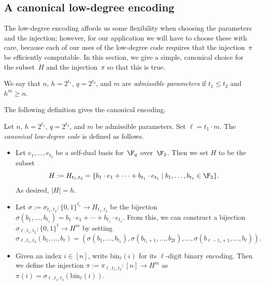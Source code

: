 \documentclass[11pt]{article}
\begin{document}
\subsection{A canonical low-degree encoding}

The low-degree encoding affords us some flexibility when choosing the parameters and the injection;
however, for our application we will have to choose these with care,
because each of our uses of the low-degree code requires that the injection~$\pi$ be efficiently computable.
In this section, we give a simple, canonical choice for the subset~$H$ and the injection~$\pi$ so that this is true.

\begin{definition}\label{def:admissible-prelims}
We say that
$n$,
$h= 2^{t_1}$,
$q = 2^{t_2}$,
and $m$
are \emph{admissible parameters} if $t_1 \leq t_2$ and $h^m\geq n$.
\end{definition}

The following definition gives the canonical encoding.

\begin{definition}\label{def:canonical-low-degree}
Let $n$, $h = 2^{t_1}$, $q= 2^{t_2}$, and $m$ be admissible parameters.
Set $\ell = t_1 \cdot m$.
The \emph{canonical low-degree code} is defined as follows.
\begin{itemize}
\item[(i)] Let $e_1, \ldots, e_{t_2}$ be a self-dual basis for~$\F_q$ over~$\F_2$. Then we set $H$ to be the subset
	\begin{equation*}
		H:= H_{t_1, t_2} = \{b_1 \cdot e_1 + \cdots + b_{t_1} \cdot e_{t_1} \mid b_1, \ldots, b_{t_1} \in \F_2\}.
	\end{equation*}
	As desired, $|H| = h$.
\item[(ii)] Let $\sigma:= \sigma_{t_1, t_2}: \{0, 1\}^{t_1} \rightarrow H_{t_1, t_2}$ be the bijection $\sigma(b_1, \ldots, b_{t_1}) = b_1 \cdot e_1 + \cdots + b_{t_1} \cdot e_{t_1}$.
	From this, we can construct a bijection $\sigma_{\ell, t_1, t_2} : \{0, 1\}^\ell \rightarrow H^m$ by setting
	\begin{equation*}
		\sigma_{\ell, t_1, t_2}(b_1, \ldots, b_\ell) = (\sigma(b_1, \ldots, b_{t_1}), \sigma(b_{t_1+1}, \ldots, b_{2t}), \ldots, \sigma(b_{\ell-t_1+1}, \ldots, b_{\ell})).
	\end{equation*}
\item[(iii)] Given an index $i \in [n]$, write $\mathrm{bin}_\ell(i)$ for its $\ell$-digit binary encoding. 
	Then we define the injection $\pi:=\pi_{\ell, t_1, t_2}:[n] \rightarrow H^m$ as $\pi(i) = \sigma_{\ell, t_1, t_2}(\mathrm{bin}_\ell(i))$.
\end{itemize}
\end{definition}
\end{document}
